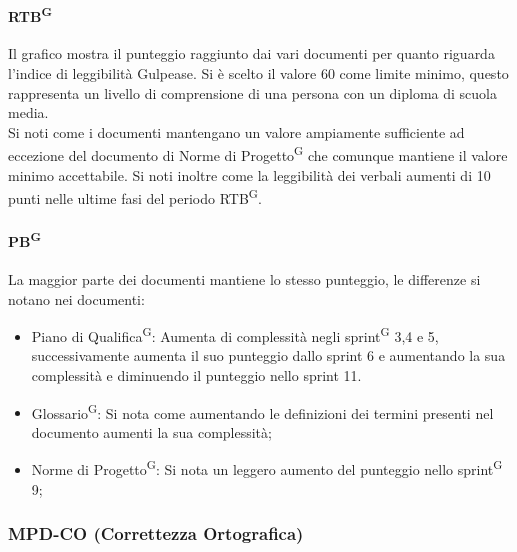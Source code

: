 \documentclass[5pt]{article}
\begin{document}
	\paragraph{RTB\textsuperscript{G}} Il grafico mostra il punteggio raggiunto dai vari documenti per quanto riguarda l'indice di leggibilità Gulpease. Si è scelto il valore 60 come limite minimo, questo rappresenta un livello di comprensione di una persona con un diploma di scuola media.\\
	Si noti come i documenti mantengano un valore ampiamente sufficiente ad eccezione del documento di Norme di Progetto\textsuperscript{G} che comunque mantiene il valore minimo accettabile. Si noti inoltre come la leggibilità dei verbali aumenti di 10 punti nelle ultime fasi del periodo RTB\textsuperscript{G}.
	
	\paragraph{PB\textsuperscript{G}} La maggior parte dei documenti mantiene lo stesso punteggio, le differenze si notano nei documenti: 
	\begin{itemize}
		\item Piano di Qualifica\textsuperscript{G}: Aumenta di complessità negli sprint\textsuperscript{G} 3,4 e 5, successivamente aumenta il suo punteggio dallo sprint 6 e aumentando la sua complessità e diminuendo il punteggio nello sprint 11.
		\item Glossario\textsuperscript{G}: Si nota come aumentando le definizioni dei termini presenti nel documento aumenti la sua complessità;
		\item Norme di Progetto\textsuperscript{G}: Si nota un leggero aumento del punteggio nello sprint\textsuperscript{G} 9;
	\end{itemize}
	
	\subsubsection{MPD-CO (Correttezza Ortografica)}
	
\end{document}
